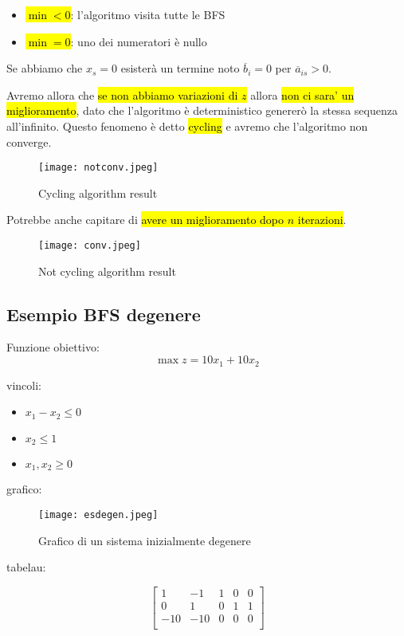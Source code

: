 \begin{itemize}
	\item \hl{$\min < 0$}: l'algoritmo visita tutte le BFS
	\item \hl{$\min = 0$}: uno dei numeratori è nullo
\end{itemize}

Se abbiamo che $x_s = 0$ esisterà un termine noto $\overline{b}_i = 0$ per $\overline{a}_{is} > 0$.

Avremo allora che \hl{se non abbiamo variazioni di $z$} allora \hl{non ci sara' un miglioramento}, dato che l'algoritmo è deterministico genererò la stessa sequenza all'infinito. Questo fenomeno è detto \hl{cycling} e avremo che l'algoritmo non converge.


\begin{figure}[H]
\centering
\texttt{[image: notconv.jpeg]}
\caption{Cycling algorithm result} 
\label{notconv}
\end{figure}
	

Potrebbe anche capitare di \hl{avere un miglioramento dopo $n$ iterazioni}.


\begin{figure}[H]
\centering
\texttt{[image: conv.jpeg]}
\caption{Not cycling algorithm result} 
\label{conv}
\end{figure}
		
	
\subsection{Esempio BFS degenere}

Funzione obiettivo:
$$\max z = 10x_1 + 10x_2$$

vincoli:

\begin{itemize}
	\item $x_1 - x_2 \leq 0$
	\item $x_2 \leq 1$
	\item $x_1, x_2 \geq 0$
\end{itemize}

grafico:


\begin{figure}[H]
\centering
\texttt{[image: esdegen.jpeg]}
\caption{Grafico di un sistema inizialmente degenere} 
\label{esdegen}
\end{figure}

tabelau:

$$
\left[ {\begin{array}{ccccc}
	1 & -1 & 1 & 0 & 0\\
	0 & 1 & 0 & 1 & 1\\
	-10 & -10 & 0 & 0 & 0\\
\end{array} } \right]
$$

